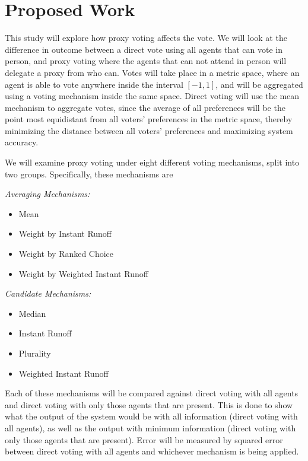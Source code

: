 {\section{Proposed Work}\label{sec:contribution}
This study will explore how proxy voting affects the vote.
We will look at the difference in outcome between a direct vote using all agents that
can vote in person, and proxy voting where the agents that can not attend in person
will delegate a proxy from who can.
Votes will take place in a metric space, where an agent is able to vote anywhere
inside the interval $[-1, 1]$, and will be aggregated using a voting mechanism inside
the same space.
Direct voting will use the mean mechanism to aggregate votes, since the average of
all preferences will be the point most equidistant from all voters' preferences in
the metric space, thereby minimizing the distance between all voters' preferences and
maximizing system accuracy.

We will examine proxy voting under eight different voting mechanisms, split into two
groups.
Specifically, these mechanisms are\\
\begin{samepage}
    \textit{Averaging Mechanisms:}
    \begin{itemize}
        \item Mean
        \item Weight by Instant Runoff
        \item Weight by Ranked Choice
        \item Weight by Weighted Instant Runoff
    \end{itemize}
    \textit{Candidate Mechanisms:}
    \begin{itemize}
        \item Median
        \item Instant Runoff
        \item Plurality
        \item Weighted Instant Runoff
    \end{itemize}
\end{samepage}
Each of these mechanisms will be compared against direct voting with all agents and
direct voting with only those agents that are present.
This is done to show what the output of the system would be with all information
(direct voting with all agents), as well as the output with minimum information
(direct voting with only those agents that are present).
Error will be measured by squared error between direct voting with all agents and
whichever mechanism is being applied.

}
